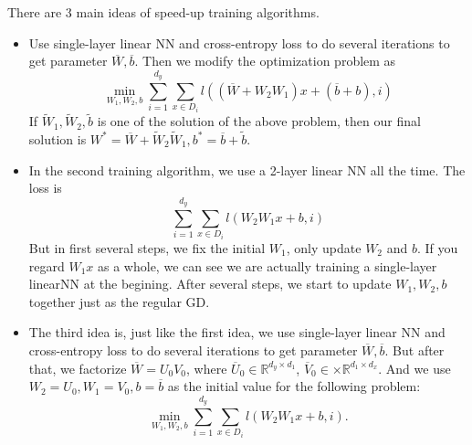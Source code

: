 There are 3 main ideas of speed-up training algorithms.
\begin{itemize}
	\item  Use single-layer linear NN and cross-entropy loss to do several iterations to get parameter $\overline{W}, \overline{b}$. Then we modify the optimization problem as
	\begin{equation}
		\min_{W_1,W_2,b}\sum_{i = 1}^{d_y} \sum_{x\in D_i} l((\overline{W}+W_2 W_1)x + (\overline{b}+b), i) 
	\end{equation}
	If $\tilde{W}_1,\tilde{W}_2,\tilde{b}$ is one of the solution of the above problem, then our final solution is $W^* = \overline{W} + \tilde{W}_2\tilde{W}_1, b^* = \overline{b} + \tilde{b}$.\\
	
	\item In the second training algorithm, we use a 2-layer linear NN all the time. The loss is 
	\begin{equation}
	\sum_{i = 1}^{d_y} \sum_{x\in D_i} l(W_2 W_1x + b, i) 
	\end{equation}
	 But in first several steps, we fix the initial $W_1$, only update $W_2$ and $b$. If you regard $W_1 x$ as a whole, we can see we are actually training a single-layer linearNN at the begining. After several steps, we start to update $W_1,W_2,b$ together just as the regular GD.\\
	 
	 \item The third idea is, just like the first idea, we use single-layer linear NN and cross-entropy loss to do several iterations to get parameter $\overline{W}, \overline{b}$. But after that, we factorize $\overline{W} = U_0 V_0$, where $\overline{U}_0\in \mathbb{R}^{d_y\times d_1}$, $\overline{V}_0\in\times \mathbb{R}^{d_1\times d_x}$. And we use $W_2 = U_0, W_1 = V_0, b = \overline{b}$ as the initial value for the following problem:
	 \begin{equation}
	 \min_{W_1,W_2,b} \sum_{i = 1}^{d_y} \sum_{x\in D_i} l(W_2 W_1x + b, i) .
	 \end{equation}

	 
\end{itemize}

